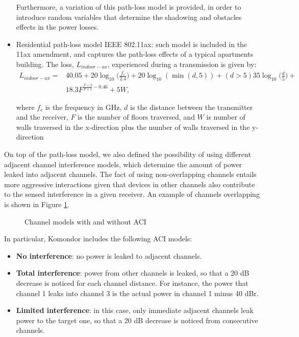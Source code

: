 \documentclass[a4paper]{article}
\begin{document}
\begin{itemize}
	Furthermore, a variation of this path-loss model is provided, in order to introduce random variables that determine the shadowing and obstacles effects in the power losses.
	\item Residential path-loss model IEEE 802.11ax: such model is included in the 11ax amendment, and captures the path-loss effects of a typical apartments building. The loss, $L_{indoor-ax}$, experienced during a transmission is given by:
	\begin{equation}
	\begin{aligned}
	L_{indoor-ax} = &40.05 + 20 \log_{10}\Big(\frac{f_c}{2.4}\Big) + 20 \log_{10}(\min(d,5)) + (d>5)  35 \log_{10}\Big(\frac{d}{5}\Big) + \\
	&18.3 F^{\frac{F+2}{F+1}-0.46} + 5 W,
	\end{aligned}
	\nonumber
	\end{equation}
	
	where $f_c$ is the frequency in GHz, $d$ is the distance between the transmitter and the receiver, $F$ is the number of floors traversed, and $W$ is number of walls traversed in the x-direction plus the number of walls traversed in the y-direction
\end{itemize}	

On top of the path-loss model, we also defined the possibility of using different adjacent channel interference models, which determine the amount of power leaked into adjacent channels. The fact of using non-overlapping channels entails more aggressive interactions given that devices in other channels also contribute to the sensed interference in a given receiver. An example of channels overlapping is shown in Figure \ref{fig:cochannel_interference}.
\begin{figure}[h!]
	\centering
	\caption{Channel models with and without ACI}
	\label{fig:cochannel_interference}
\end{figure}	

In particular, Komondor includes the following ACI models:		
\begin{itemize}
	\item \textbf{No interference}: no power is leaked to adjacent channels.
	\item \textbf{Total interference}: power from other channels is leaked, so that a 20 dB decrease is noticed for each channel distance. For instance, the power that channel 1 leaks into channel 3 is the actual power in channel 1 minus 40 dBr. 
	\item \textbf{Limited interference}: in this case, only immediate adjacent channels leak power to the target one, so that a 20 dB decrease is noticed from consecutive channels.
\end{itemize}
\end{document}
